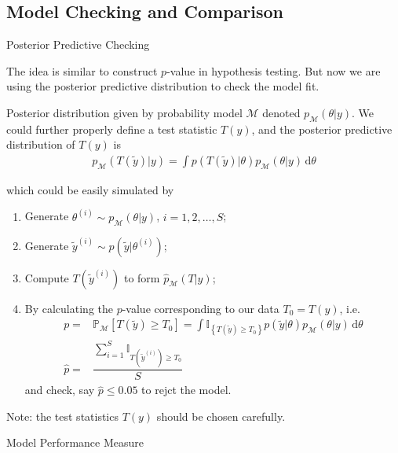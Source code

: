 \subsection{Model Checking and Comparison}

\begin{point}
    Posterior Predictive Checking
\end{point}

The idea is similar to construct $ p $-value in hypothesis testing. But now we are using the posterior predictive distribution to check the model fit. 

Posterior distribution given by probability model $ \mathcal{M} $ denoted $ p_\mathcal{M}(\theta |y) $. We could further properly define a test statistic $ T(y) $, and the posterior predictive distribution of $ T(y) $ is
\begin{align}
    p_\mathcal{M}(T(\tilde{y})|y)=\int p(T(\tilde{y})|\theta )p_\mathcal{M}(\theta |y)\,\mathrm{d}\theta
\end{align}

which could be easily simulated by 
\begin{enumerate}[topsep=2pt,itemsep=2pt]
    \item Generate $ \theta ^{(i)}\sim p_\mathcal{M}(\theta |y) $, $ i=1,2,\ldots,S $;
    \item Generate $ \tilde{y}^{(i)}\sim p(\tilde{y}|\theta ^{(i)}) $;
    \item Compute $ T(\tilde{y}^{(i)}) $ to form $ \hat{p}_\mathcal{M}(T|y) $;
    \item By calculating the $ p $-value corresponding to our data $ T_0=T(y) $, i.e.
    \begin{align}
        p=& \mathbb{P}_{\mathcal{M}}\left[ T(\tilde{y})\geqslant T_0 \right] =\int \mathbb{I}_{\left\{ T(\tilde{y})\geqslant T_0 \right\} }p(\tilde{y}|\theta )p_\mathcal{M}(\theta |y)\,\mathrm{d}\theta\\
        \hat{p}=& \dfrac{ \sum_{i=1}^S\mathbb{I}_{T(\tilde{y}^{(i)})\geq T_0} }{ S }
    \end{align}
    and check, say $ \hat{p}\leq 0.05 $ to rejct the model.
    
\end{enumerate}

Note: the test statistics $ T(y) $ should be chosen carefully.

    



\begin{point}
    Model Performance Measure
\end{point}


